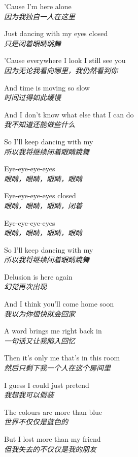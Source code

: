 \begin{spacing}{1.5}
\begin{flushleft}
'Cause I'm here alone\\
\textit{因为我独自一人在这里}\lyricspace

Just dancing with my eyes closed\\
\textit{只是闭着眼睛跳舞}\lyricspace

'Cause everywhere I look I still see you\\
\textit{因为无论我看向哪里，我仍然看到你}\lyricspace

And time is moving so slow\\
\textit{时间过得如此缓慢}\lyricspace

And I don't know what else that I can do\\
\textit{我不知道还能做些什么}\lyricspace

So I'll keep dancing with my\\
\textit{所以我将继续闭着眼睛跳舞}\lyricspace

Eye-eye-eye-eyes\\
\textit{眼睛，眼睛，眼睛，眼睛}\lyricspace

Eye-eye-eye-eyes closed\\
\textit{眼睛，眼睛，眼睛，闭着}\lyricspace

Eye-eye-eye-eyes\\
\textit{眼睛，眼睛，眼睛，眼睛}\lyricspace

So I'll keep dancing with my\\
\textit{所以我将继续闭着眼睛跳舞}\lyricspace

Delusion is here again\\
\textit{幻觉再次出现}\lyricspace

And I think you'll come home soon\\
\textit{我以为你很快就会回家}\lyricspace

A word brings me right back in\\
\textit{一句话又让我陷入回忆}\lyricspace

Then it's only me that's in this room\\
\textit{然后只剩下我一个人在这个房间里}\lyricspace

I guess I could just pretend\\
\textit{我想我可以假装}\lyricspace

The colours are more than blue\\
\textit{世界不仅仅是蓝色的}\lyricspace

But I lost more than my friend\\
\textit{但我失去的不仅仅是我的朋友}\lyricspace


\end{flushleft}
\end{spacing}
